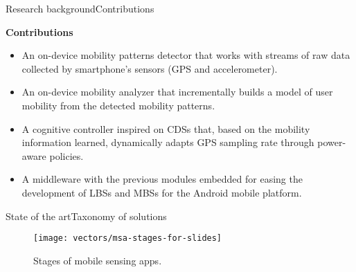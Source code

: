 \begin{frame}[noframenumbering]{Research background}{Contributions}
\small
\begin{block}{\small \textbf{Contributions}}
\begin{itemize}
  \item An on-device mobility patterns detector that works with streams of raw data collected by smartphone's sensors (GPS and accelerometer).
  \item An on-device mobility analyzer that incrementally builds a model of user mobility from the detected mobility patterns.
  \item A cognitive controller inspired on CDSs that, based on the mobility information learned, dynamically adapts GPS sampling rate through power-aware policies. 
  \item A middleware with the previous modules embedded for easing the development of LBSs and MBSs for the Android mobile platform.
\end{itemize}
\end{block}
\end{frame}

\begin{frame}[noframenumbering]{State of the art}{Taxonomy of solutions}
\begin{figure}
  \centering
  \texttt{[image: vectors/msa-stages-for-slides]}
  \caption{Stages of mobile sensing apps.}
\end{figure}
\end{frame}

